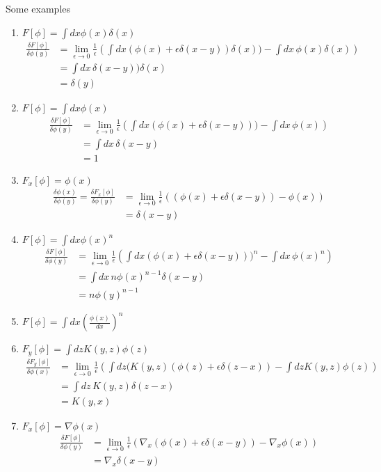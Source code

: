 \documentclass[10pt,a4paper]{article}
\theoremstyle{definition}
\begin{document}
Some examples
\begin{enumerate}
    \item $F[\phi]=\int dx \phi(x)\delta(x)$
    \begin{align}
        \frac{\delta F[\phi]}{\delta\phi(y)}
           &=\lim_{\epsilon\rightarrow0}\frac{1}{\epsilon}\left(\int dx(\phi(x)+\epsilon\delta(x-y))\delta(x))-\int
        dx\,\phi(x)\delta(x)\right)\\
        &=\int dx\,\delta(x-y))\delta(x)\\
       &=\delta(y)
    \end{align}
    \item $F[\phi]=\int dx \phi(x)$
    \begin{align}
        \frac{\delta F[\phi]}{\delta\phi(y)}
        &=\lim_{\epsilon\rightarrow0}\frac{1}{\epsilon}\left(\int dx(\phi(x)+\epsilon\delta(x-y)))-\int dx\,\phi(x)\right)\\
        &=\int dx\,\delta(x-y)\\
        &=1
    \end{align}
    \item $F_x[\phi]=\phi(x)$
    \begin{align}
        \frac{\delta \phi(x)}{\delta\phi(y)}=\frac{\delta F_x[\phi]}{\delta\phi(y)}
        &=\lim_{\epsilon\rightarrow0}\frac{1}{\epsilon}\left((\phi(x)+\epsilon\delta(x-y))-\phi(x)\right)\\
        &=\delta(x-y)
    \end{align}
    \item $F[\phi]=\int dx \phi(x)^n$
    \begin{align}
        \frac{\delta F[\phi]}{\delta\phi(y)}
        &=\lim_{\epsilon\rightarrow0}\frac{1}{\epsilon}\left(\int dx(\phi(x)+\epsilon\delta(x-y)))^n-\int dx\,\phi(x)^n\right)\\
        &=\int dx\,n\phi(x)^{n-1}\delta(x-y)\\
        &=n\phi(y)^{n-1}
    \end{align}
    \item $F[\phi]=\int dx \left(\frac{\phi(x)}{dx}\right)^n$
    \item $F_y[\phi]=\int dz K(y,z)\phi(z)$
    \begin{align}
        \frac{\delta F_y[\phi]}{\delta\phi(x)}
           &=\lim_{\epsilon\rightarrow0}\frac{1}{\epsilon}\left(\int dz(K(y,z)(\phi(z)+\epsilon\delta(z-x)) -\int dz K(y,z)\phi(z)\right)\\
           &=\int dz\,K(y,z)\delta(z-x)\\
           &=K(y,x)
    \end{align}
    \item $F_x[\phi]=\nabla\phi(x)$
    \begin{align}
        \frac{\delta F[\phi]}{\delta\phi(y)}
        &=\lim_{\epsilon\rightarrow0}\frac{1}{\epsilon}\left( \nabla_x(\phi(x)+\epsilon\delta(x-y)) - \nabla_x\phi(x)\right)\\
        &=\nabla_x\delta(x-y)
    \end{align}
\end{enumerate}
\end{document}
